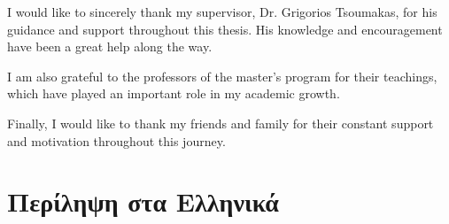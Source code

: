 \documentclass[
12pt, %
english, %
onehalfspacing, %
headsepline, %
]{MastersDoctoralThesis} %
\begin{document}
\begin{acknowledgements}
\addchaptertocentry{\acknowledgementname} %
I would like to sincerely thank my supervisor, Dr. Grigorios Tsoumakas, for his guidance and support throughout this thesis. His knowledge and encouragement have been a great help along the way.

I am also grateful to the professors of the master’s program for their teachings, which have played an important role in my academic growth.

Finally, I would like to thank my friends and family for their constant support and motivation throughout this journey.

\end{acknowledgements}

\chapter{Περίληψη στα Ελληνικά}
\end{document}
